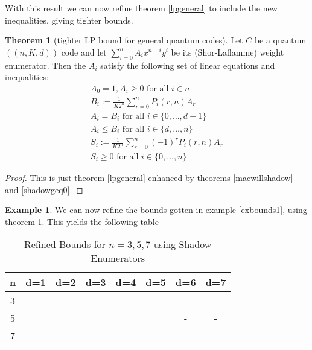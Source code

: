\documentclass{article}
\def\n{\underline{n}}
\def\fa{\text{ for all }}
\theoremstyle{definition}
\newtheorem{theorem}[Satz]{Theorem}
\newtheorem{ex}[Satz]{Example}
\begin{document}
With this result we can now refine theorem \ref{lpgeneral} to include the new inequalities, giving tighter bounds.

\begin{theorem}[tighter LP bound for general quantum codes]\label{lpshadow}
Let $C$ be a quantum $((n,K,d))$ code and let $\sum_{i=0}^n A_i x^{n-i} y^{i}$ be its (Shor-Laflamme) weight enumerator. Then the $A_i$ satisfy the following set of linear equations and inequalities:
\begin{align}
A_0 = 1, A_i \geq 0 \fa i \in \n \\
B_i := \frac{1}{K 2^{n}} \sum_{r=0}^n P_i(r,n) A_r \\
A_i = B_i \fa i \in \{0, \ldots, d-1 \} \\
A_i \leq B_i \fa i \in \{d, \ldots, n \} \\
S_i := \frac{1}{K 2^{n}} \sum_{r=0}^n (-1)^r P_i(r,n) A_r \\
S_i \geq 0 \fa i \in \{0, \ldots, n \}
\end{align}
\begin{proof}
This is just theorem \ref{lpgeneral} enhanced by theorems \ref{macwillshadow} and \ref{shadowgeq0}.
\end{proof}
\end{theorem}

\begin{ex}
We can now refine the bounds gotten in example \ref{exbounds1}, using theorem \ref{lpshadow}. This yields the following table

\begin{table}[h]\label{tablebounds1}
\centering
\begin{tabular}{|c|c|c|c|c|c|c|c|}
\hline

n & d=1 & d=2 & d=3 & d=4 & d=5 & d=6 & d=7\\ \hline
3 & & & & - & - & - & - \\ \hline
5 & & & & & & - & -  \\ \hline
7 & & & & & & &  \\ \hline 
\end{tabular}
\caption{Refined Bounds for $n=3,5,7$ using Shadow Enumerators}
\end{table}
\end{ex}

\end{document}
